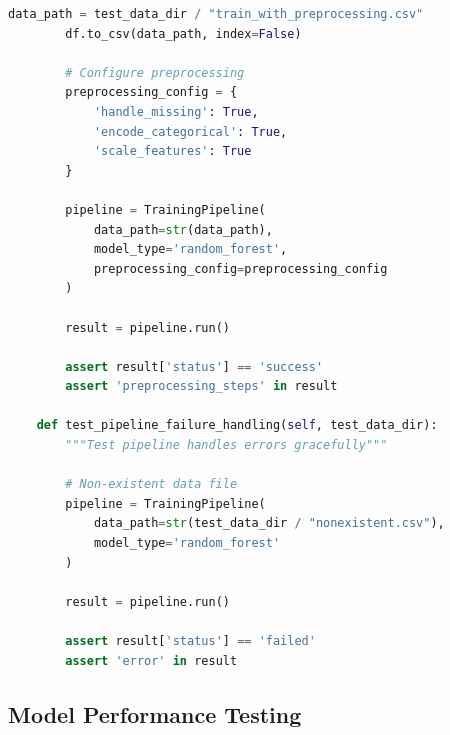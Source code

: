 \begin{lstlisting}[language=Python, caption=Comprehensive ML Testing Suite]
        data_path = test_data_dir / "train_with_preprocessing.csv"
        df.to_csv(data_path, index=False)

        # Configure preprocessing
        preprocessing_config = {
            'handle_missing': True,
            'encode_categorical': True,
            'scale_features': True
        }

        pipeline = TrainingPipeline(
            data_path=str(data_path),
            model_type='random_forest',
            preprocessing_config=preprocessing_config
        )

        result = pipeline.run()

        assert result['status'] == 'success'
        assert 'preprocessing_steps' in result

    def test_pipeline_failure_handling(self, test_data_dir):
        """Test pipeline handles errors gracefully"""

        # Non-existent data file
        pipeline = TrainingPipeline(
            data_path=str(test_data_dir / "nonexistent.csv"),
            model_type='random_forest'
        )

        result = pipeline.run()

        assert result['status'] == 'failed'
        assert 'error' in result

\end{lstlisting}

\subsection{Model Performance Testing}

